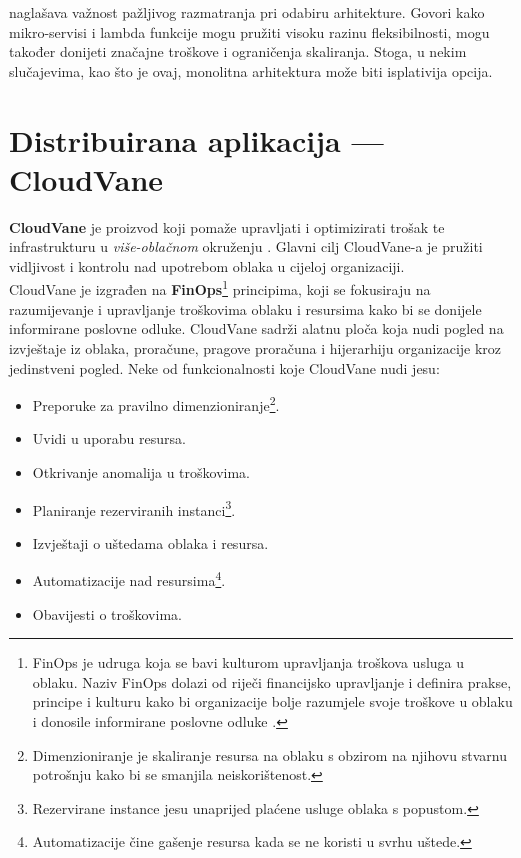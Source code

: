 \documentclass[times, utf8, diplomski]{fer}
\begin{document}
\citet{kolny_scaling_2023} naglašava važnost pažljivog razmatranja pri odabiru arhitekture. Govori kako mikro-servisi i lambda funkcije mogu pružiti visoku razinu fleksibilnosti, mogu također donijeti značajne troškove i ograničenja skaliranja. Stoga, u nekim slučajevima, kao što je ovaj, monolitna arhitektura može biti isplativija opcija.



\chapter{Distribuirana aplikacija --- CloudVane}
\label{sec:cloudvane}

\textbf{CloudVane} je proizvod koji pomaže upravljati i optimizirati trošak te infrastrukturu u \emph{više-oblačnom}  okruženju  \citep{neos_cloudvane_2023}. Glavni cilj CloudVane-a je pružiti vidljivost i kontrolu nad upotrebom oblaka  u cijeloj organizaciji. \\

CloudVane je izgrađen na \textbf{FinOps}\footnote{FinOps je udruga koja se bavi kulturom upravljanja troškova usluga u oblaku. Naziv FinOps dolazi od riječi financijsko upravljanje i definira prakse, principe i kulturu kako bi organizacije bolje razumjele svoje troškove u oblaku i donosile informirane poslovne odluke \citep{finops_fundation_finops_nodate}.} principima, koji se fokusiraju na razumijevanje i upravljanje troškovima oblaku i resursima kako bi se donijele informirane poslovne odluke. CloudVane sadrži alatnu ploča  koja nudi pogled na izvještaje iz oblaka, proračune, pragove proračuna i hijerarhiju organizacije kroz jedinstveni pogled.
Neke od funkcionalnosti koje CloudVane nudi jesu:

\begin{itemize} 
\item Preporuke za pravilno dimenzioniranje\footnote{Dimenzioniranje je skaliranje resursa na oblaku s obzirom na njihovu stvarnu potrošnju kako bi se smanjila neiskorištenost.}.
\item Uvidi u uporabu resursa.
\item Otkrivanje anomalija u troškovima.
\item Planiranje rezerviranih instanci\footnote{Rezervirane instance  jesu unaprijed plaćene usluge oblaka s popustom.}.
\item Izvještaji o uštedama oblaka i resursa.
\item Automatizacije nad resursima\footnote{Automatizacije čine gašenje resursa kada se ne koristi u svrhu uštede.}.
\item Obavijesti o troškovima.
\end{itemize}
\end{document}
